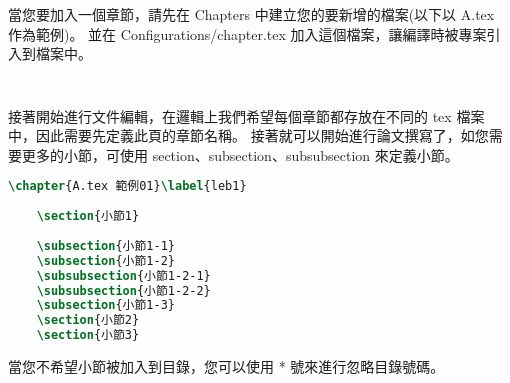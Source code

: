 當您要加入一個章節，請先在 Chapters 中建立您的要新增的檔案(以下以 A.tex 作為範例)。
並在 Configurations/chapter.tex 加入這個檔案，讓編譯時被專案引入到檔案中。

\begin{lstlisting}[language=TeX]
    
\end{lstlisting}

接著開始進行文件編輯，在邏輯上我們希望每個章節都存放在不同的 tex 檔案中，因此需要先定義此頁的章節名稱。
接著就可以開始進行論文撰寫了，如您需要更多的小節，可使用 section、subsection、subsubsection 來定義小節。

\begin{lstlisting}[language=TeX]
    \chapter{A.tex 範例01}\label{leb1}
    
    \section{小節1}
    
    \subsection{小節1-1}
    \subsection{小節1-2}
    \subsubsection{小節1-2-1}
    \subsubsection{小節1-2-2}
    \subsection{小節1-3}
    \section{小節2}
    \section{小節3}
\end{lstlisting}

當您不希望小節被加入到目錄，您可以使用 * 號來進行忽略目錄號碼。

